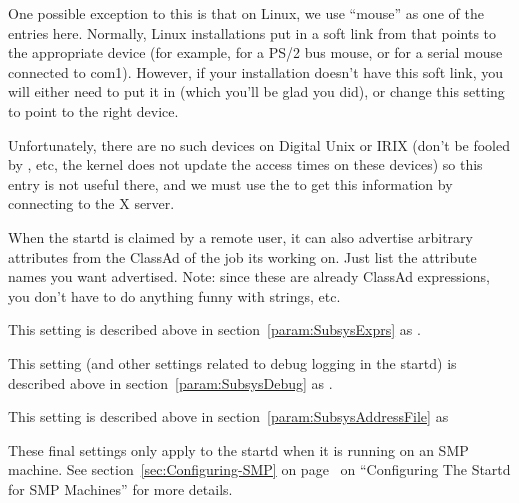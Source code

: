 \begin{description}
  One possible exception to this is that on Linux, we use ``mouse'' as
  one of the entries here.  Normally, Linux installations put in a
  soft link from  that points to the appropriate
  device (for example,  for a PS/2 bus mouse, or
   for a serial mouse connected to com1).  However,
  if your installation doesn't have this soft link, you will either
  need to put it in (which you'll be glad you did), or change this
  setting to point to the right device. 
  
  Unfortunately, there are no such devices on Digital Unix or IRIX
  (don't be fooled by , etc, the kernel does not
  update the access times on these devices) so this entry is not
  useful there, and we must use the  to get this
  information by connecting to the X server.
  
\item[\Macro{STARTD\_JOB\_EXPRS}] \label{param:StartdJobExprs} When
  the startd is claimed by a remote user, it can also advertise
  arbitrary attributes from the ClassAd of the job its working on.
  Just list the attribute names you want advertised.  Note: since
  these are already ClassAd expressions, you don't have to do anything
  funny with strings, etc.

\item[\Macro{STARTD\_EXPRS}] \label{param:StartdExprs} This setting is
  described above in section~\ref{param:SubsysExprs} as
  .

\item[\Macro{STARTD\_DEBUG}] \label{param:StartdDebug} This setting
  (and other settings related to debug logging in the startd) is
  described above in section~\ref{param:SubsysDebug} as
  .

\item[\Macro{STARTD\_ADDRESS\_FILE}] \label{param:StartdAddressFile}
  This setting is described above in
  section~\ref{param:SubsysAddressFile} as

\end{description}

These final settings only apply to the startd when it is running on an
SMP machine. 
See section~\ref{sec:Configuring-SMP} on
page~\pageref{sec:Configuring-SMP} on ``Configuring The Startd for 
SMP Machines'' for more details.



